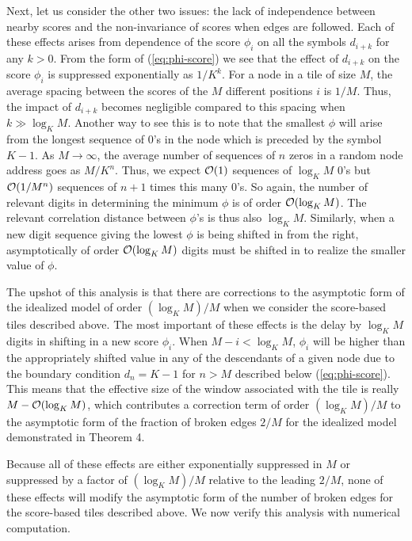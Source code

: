 \documentclass[12pt]{article}
\begin{document}
Next, let us consider the other two issues: the lack of independence
between nearby scores and the non-invariance of scores when edges are
followed.  Each of these effects arises from dependence of the score
$\phi_i$ on all the symbols $d_{i + k}$ for any $k > 0$.  From the
form of (\ref{eq:phi-score}) we see that the effect of $d_{i + k}$ on
the score $\phi_i$ is suppressed exponentially as $1/K^k$.  For a node
in a tile of size $M$, the average spacing between the scores of the
$M$ different positions $i$ is $1/M$.  Thus, the impact of $d_{i + k}$
becomes negligible compared to this spacing when $k\gg\log_K M$.
Another way to see this is to note that the smallest $\phi$ will arise
from the longest sequence of 0's in the node which is preceded by the
symbol $K -1$.  As $M \rightarrow \infty$, the average number of
sequences of $n$ zeros in a random node address goes as $M/K^n$.
Thus, we expect ${\cal O} (1)$ sequences of $\log_K M$ 0's but 
${\cal O} (1/M^n)$ sequences of $n + 1$ times this many 0's.  So again, the
number of relevant digits in determining the minimum $\phi$ is of order
${\cal O} (\log_K M)$.  The relevant correlation distance between $\phi$'s is
thus also $\log_K M$.  Similarly, when a new digit sequence giving the
lowest $\phi$ is being shifted in from the right, asymptotically of
order ${\cal O} (\log_K M)$ digits must be shifted in to realize the smaller
value of $\phi$.

The upshot of this analysis is that there are corrections to the
asymptotic form of the idealized model of order $(\log_K M)/M$ when we
consider the score-based tiles described above.  The most important of
these effects is the delay by $\log_K M$ digits in shifting in a new
score $\phi_i$.  When $M-i <\log_K M$, $\phi_i$ will be higher than
the appropriately shifted value in any of the descendants of a given
node due to the boundary condition $d_n = K -1$ for $n > M$ described
below (\ref{eq:phi-score}).  This means that the effective size of the
window associated with the tile is really $M-{\cal O} (\log_K M)$,
which contributes a correction term of order $(\log_K M)/M$ to the
asymptotic form of the fraction of broken edges $2/M$ for the
idealized model demonstrated in Theorem 4.

Because all of these effects are either exponentially suppressed in
$M$ or suppressed by a factor of $(\log_K M)/M$ relative to the
leading $2/M$, none of these effects will modify the asymptotic form
of the number of broken edges for the score-based tiles described
above.  We now verify this analysis with numerical computation.
\end{document}
